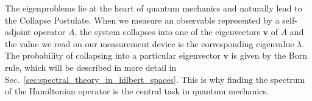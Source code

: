 The eigenproblems lie at the heart of quantum mechanics and naturally lead to the Collapse Postulate. When we measure an observable represented by a self-adjoint operator $A$, the system collapses into one of the eigenvectors $\symbf{v}$ of $A$ and the value we read on our measurement device is the corresponding eigenvalue $\lambda$. The probability of collapsing into a particular eigenvector $\symbf{v}$ is given by the Born rule, which will be described in more detail in Sec.~\ref{sec:spectral_theory_in_hilbert_spaces}. This is why finding the spectrum of the Hamiltonian operator is the central task in quantum mechanics.
